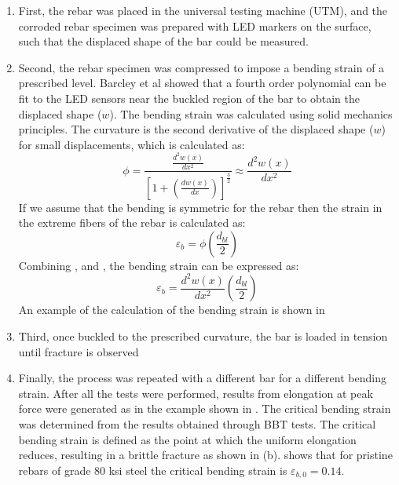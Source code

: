 \begin{enumerate}
    \item First, the rebar was placed in the universal testing machine (UTM), and the corroded rebar specimen was prepared with LED markers on the surface, such that the displaced shape of the bar could be measured.
    \item Second, the rebar specimen was compressed to impose a bending strain of a prescribed level. Barcley et al showed that a fourth order polynomial can be fit to the LED sensors near the buckled region of the bar to obtain the displaced shape ($w$). The bending strain was calculated using solid mechanics principles. The curvature is the second derivative of the displaced shape ($w$) for small displacements, which is calculated as: 
    \begin{equation}
        \phi=\frac{\frac{d^2w(x)}{dx^2}}{\left[1+\left(\frac{dw(x)}{dx}\right)\right]^\frac{3}{2}}\approx \frac{d^2w(x)}{dx^2}
        \label{eq.CuvatureAprox}
    \end{equation}
    If we assume that the bending is symmetric for the rebar then the strain in the extreme fibers of the rebar is calculated as:
    \begin{equation}
        \varepsilon_{b}=\phi\left(\frac{d_{bl}}{2}\right) 
        \label{eq.BendingStrain}
    \end{equation}    
    Combining , and , the bending strain can be expressed as:
    \begin{equation}
        \varepsilon_{b}=\frac{d^2w(x)}{dx^2}\left(\frac{d_{bl}}{2}\right) 
        \label{eq.BendingStrainExpanded}
    \end{equation}
    An example of the calculation of the bending strain is shown in 
    \item Third, once buckled to the prescribed curvature, the bar is loaded in tension until fracture is observed
    \item Finally, the process was repeated with a different bar for a different bending strain. After all the tests were performed, results from elongation at peak force were generated as in the example shown in  . The critical bending strain was determined from the results obtained through BBT tests. The critical bending strain is defined as the point at which the uniform elongation reduces, resulting in a brittle fracture as shown in  (b).  shows that for pristine rebars of grade 80 ksi steel the critical bending strain is $\varepsilon_{b,0}=0.14$.
\end{enumerate}

